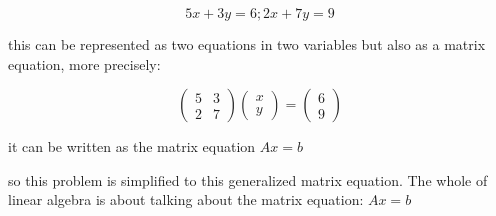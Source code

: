 \begin{equation}
    5x+3y=6; 2x+7y=9
\end{equation}

this can be represented as two equations in two variables but also as a matrix equation, more precisely:

\begin{equation}
    \begin{pmatrix}
        5 & 3\\
        2 & 7
    \end{pmatrix}\begin{pmatrix}
        x\\y
    \end{pmatrix}=\begin{pmatrix}
        6 \\9
    \end{pmatrix}
\end{equation}

it can be written as the matrix equation $Ax=b$

so this problem is simplified to this generalized matrix equation. The whole of linear algebra is about talking about the matrix equation: $Ax=b$ 